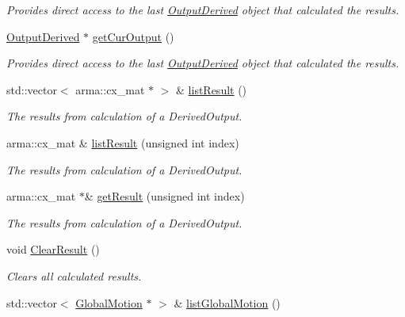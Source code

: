 \begin{DoxyCompactItemize}
\begin{DoxyCompactList}\small\item\em Provides direct access to the last \hyperlink{classosea_1_1ofreq_1_1_output_derived}{Output\-Derived} object that calculated the results. \end{DoxyCompactList}\item 
\hyperlink{classosea_1_1ofreq_1_1_output_derived}{Output\-Derived} $\ast$ \hyperlink{classosea_1_1ofreq_1_1_outputs_body_abc4561b06217666d8d87f7c493b5c147}{get\-Cur\-Output} ()
\begin{DoxyCompactList}\small\item\em Provides direct access to the last \hyperlink{classosea_1_1ofreq_1_1_output_derived}{Output\-Derived} object that calculated the results. \end{DoxyCompactList}\item 
std\-::vector$<$ arma\-::cx\-\_\-mat $\ast$ $>$ \& \hyperlink{classosea_1_1ofreq_1_1_outputs_body_a9921ceff88abf0deb7729921b244f8b2}{list\-Result} ()
\begin{DoxyCompactList}\small\item\em The results from calculation of a Derived\-Output. \end{DoxyCompactList}\item 
arma\-::cx\-\_\-mat \& \hyperlink{classosea_1_1ofreq_1_1_outputs_body_a3e8a0cf3a1289b7d72e38f1cda4cbb03}{list\-Result} (unsigned int index)
\begin{DoxyCompactList}\small\item\em The results from calculation of a Derived\-Output. \end{DoxyCompactList}\item 
arma\-::cx\-\_\-mat $\ast$\& \hyperlink{classosea_1_1ofreq_1_1_outputs_body_a9f4ce07727d5e3170ae9280b1a9ec475}{get\-Result} (unsigned int index)
\begin{DoxyCompactList}\small\item\em The results from calculation of a Derived\-Output. \end{DoxyCompactList}\item 
void \hyperlink{classosea_1_1ofreq_1_1_outputs_body_adf79e0890716bf481699c2f043934478}{Clear\-Result} ()
\begin{DoxyCompactList}\small\item\em Clears all calculated results. \end{DoxyCompactList}\item 
std\-::vector$<$ \hyperlink{classosea_1_1ofreq_1_1_global_motion}{Global\-Motion} $\ast$ $>$ \& \hyperlink{classosea_1_1ofreq_1_1_outputs_body_a517f818c77bac914ade0c345187e852c}{list\-Global\-Motion} ()

\end{DoxyCompactItemize}
